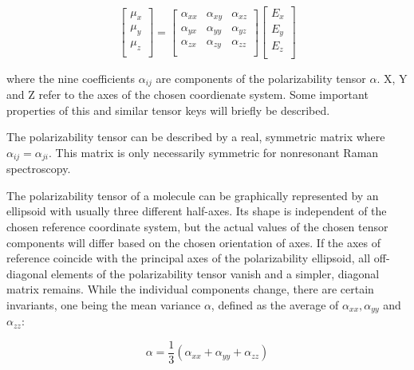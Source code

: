 \begin{equation}
    \begin{bmatrix}
        \mu_x\\
        \mu_y\\
        \mu_z\\
    \end{bmatrix}
    = 
    \begin{bmatrix}
        \alpha_{xx} & \alpha_{xy} & \alpha_{xz} \\
        \alpha_{yx} & \alpha_{yy} & \alpha_{yz}\\
        \alpha_{zx} & \alpha_{zy} & \alpha_{zz}\\
    \end{bmatrix}
    \begin{bmatrix}
        E_x\\
        E_y\\
        E_z\\
    \end{bmatrix}
\end{equation}

where the nine coefficients \(\alpha_{ij} \) are components of the polarizability tensor \(\alpha\). X, Y and Z refer to the axes of the chosen coordienate system. Some important properties of this and similar tensor keys will briefly be described.

\bigskip

The polarizability tensor can be described by a real, symmetric matrix where \(\alpha_{ij} = \alpha_{ji}\). This matrix is only necessarily symmetric for nonresonant Raman spectroscopy.  \cite{theory1} 

\bigskip

The polarizability tensor of a molecule can be graphically represented by an ellipsoid with usually three different half-axes. Its shape is independent of the chosen reference coordinate system, but the actual values of the chosen tensor components will differ based on the chosen orientation of axes. If the axes of reference coincide with the principal axes of the polarizability ellipsoid, all off-diagonal elements of the polarizability tensor vanish and a simpler,  diagonal matrix remains. While the individual components change, there are certain invariants, one being the mean variance \(\alpha\), defined as the average of \(\alpha_{xx}, \alpha_{yy} \) and \(\alpha_{zz}\):

\begin{equation}
    \alpha=\frac{1}{3}(\alpha_{xx}+\alpha_{yy}+\alpha_{zz})
\end{equation}

